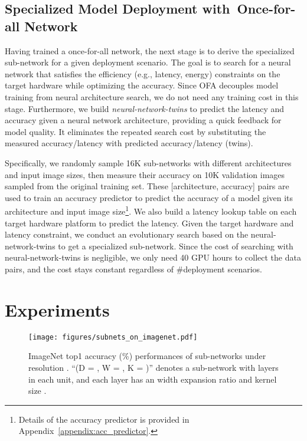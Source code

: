\documentclass{article} \usepackage{iclr2020_conference,times}
\newcommand{\motherNet}{once-for-all network}
\newcommand{\motherNetCap}{Once-for-all Network}
\begin{document}
\subsection{Specialized Model Deployment with~\motherNetCap}
\label{sec:ofa_search}
Having trained a \motherNet, the next stage is to derive the specialized sub-network for a given deployment scenario. The goal is to search for a neural network that satisfies the efficiency (e.g., latency, energy) constraints on the target hardware while optimizing the accuracy. Since OFA decouples model training from neural architecture search, we do not need any training cost in this stage. Furthermore, we build \emph{neural-network-twins} to predict the latency and accuracy given a neural network architecture, providing a quick feedback for model quality. It eliminates the repeated search cost by substituting the measured accuracy/latency with predicted accuracy/latency (twins).

Specifically, we randomly sample 16K sub-networks with different architectures and input image sizes, then measure their accuracy on 10K validation images sampled from the original training set. These [architecture, accuracy] pairs are used to train an accuracy predictor to predict the accuracy of a model given its architecture and input image size\footnote{Details of the accuracy predictor is provided in Appendix~\ref{appendix:acc_predictor}.}. We also build a latency lookup table \citep{cai2019proxylessnas} on each target hardware platform to predict the latency. Given the target hardware and latency constraint, we conduct an evolutionary search \citep{real2018regularized} based on the neural-network-twins to get a specialized sub-network. 
Since the cost of searching with neural-network-twins is negligible, we only need 40 GPU hours to collect the data pairs, and the cost stays constant regardless of \#deployment scenarios.
 
\section{Experiments}

\begin{figure}[t]
\vspace{-25pt}
    \centering
    \texttt{[image: figures/subnets\_on\_imagenet.pdf]}
    \caption{ImageNet top1 accuracy (\%) performances of sub-networks under resolution . ``(D = , W = , K = )'' denotes a sub-network with  layers in each unit, and each layer has an width expansion ratio  and kernel size .}\label{fig:paranet_net_on_imagenet}
\end{figure}
\end{document}
